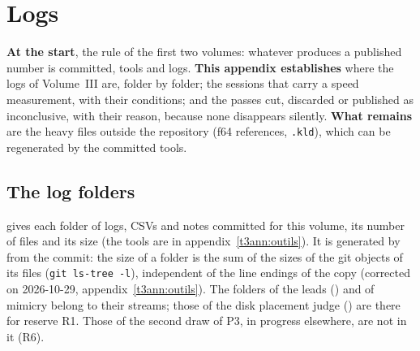 
\chapter{Logs}\label{t3ann:journaux}

\begin{origine}
\textbf{At the start}, the rule of the first two volumes: whatever produces a published number is committed, tools and logs.
\textbf{This appendix establishes} where the logs of Volume~III are, folder by folder; the sessions that carry a speed measurement, with their conditions; and the passes cut, discarded or published as inconclusive, with their reason, because none disappears silently.
\textbf{What remains} are the heavy files outside the repository (f64 references, \texttt{.kld}), which can be regenerated by the committed tools.
\end{origine}

\section{The log folders}\label{t3ann:sec:dossiers}

 gives each folder of logs, CSVs and notes committed for this volume, its number of files and its size (the tools are in appendix~\ref{t3ann:outils}). It is generated by  from the commit: the size of a folder is the sum of the sizes of the git objects of its files (\texttt{git ls-tree -l}), independent of the line endings of the copy (corrected on 2026-10-29, appendix~\ref{t3ann:outils}). The folders of the leads () and of mimicry belong to their streams; those of the disk placement judge () are there for reserve R1. Those of the second draw of P3, in progress elsewhere, are not in it (R6).



